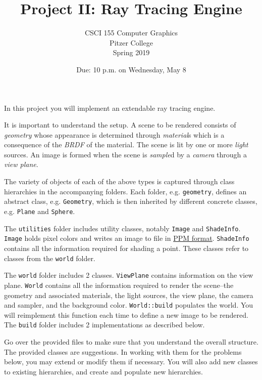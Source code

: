 \documentclass[addpoints]{exam}
\title{Project II: Ray Tracing Engine}
\author{CSCI 155 Computer Graphics\\Pitzer College\\Spring 2019}
\date{Due: 10 p.m. on Wednesday, May 8}
\begin{document}
\maketitle
\thispagestyle{empty}

In this project you will implement an extendable ray tracing engine.

It is important to understand the setup. A scene to be rendered consists of \emph{geometry} whose appearance is determined through \emph{material}s which is a consequence of the \emph{BRDF} of the material. The scene is lit by one or more \emph{light} sources. An image is formed when the scene is \emph{sample}d by a \emph{camera} through a \emph{view plane}.

The variety of objects of each of the above types is captured through class hierarchies in the accompanying folders. Each folder, e.g. \texttt{geometry}, defines an abstract class, e.g. \texttt{Geometry}, which is then inherited by different concrete classes, e.g. \texttt{Plane} and \texttt{Sphere}.

The \texttt{utilities} folder includes utility classes, notably \texttt{Image} and \texttt{ShadeInfo}. \texttt{Image} holds pixel colors and writes an image to file in \href{https://en.wikipedia.org/wiki/Netpbm_format#PBM_example}{PPM format}. \texttt{ShadeInfo} contains all the information required for shading a point. These classes refer to classes from the \texttt{world} folder.

The \texttt{world} folder includes 2 classes. \texttt{ViewPlane} contains information on the view plane. \texttt{World} contains all the information required to render the scene--the geometry and associated materials, the light sources, the view plane, the camera and sampler, and the background color. \texttt{World::build} populates the world. You will reimplement this function each time to define a new image to be rendered. The \texttt{build} folder includes 2 implementations as described below.

  Go over the provided files to make sure that you understand the overall structure. The provided classes are suggestions. In working with them for the problems below, you may extend or modify them if necessary. You will also add new classes to existing hierarchies, and create and populate new hierarchies.
\end{document}
